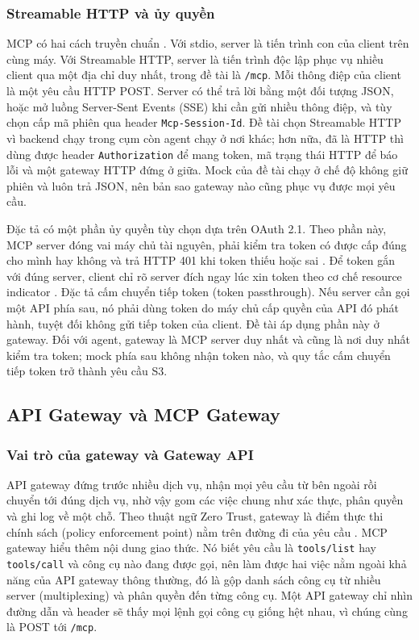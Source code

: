 \subsubsection{Streamable HTTP và ủy quyền}

MCP có hai cách truyền chuẩn \parencite{mcp_transports}. Với stdio, server là tiến trình con của client trên cùng máy. Với Streamable HTTP, server là tiến trình độc lập phục vụ nhiều client qua một địa chỉ duy nhất, trong đề tài là \texttt{/mcp}. Mỗi thông điệp của client là một yêu cầu HTTP POST. Server có thể trả lời bằng một đối tượng JSON, hoặc mở luồng Server-Sent Events (SSE) khi cần gửi nhiều thông điệp, và tùy chọn cấp mã phiên qua header \texttt{Mcp-Session-Id}. Đề tài chọn Streamable HTTP vì backend chạy trong cụm còn agent chạy ở nơi khác; hơn nữa, đã là HTTP thì dùng được header \texttt{Authorization} để mang token, mã trạng thái HTTP để báo lỗi và một gateway HTTP đứng ở giữa. Mock của đề tài chạy ở chế độ không giữ phiên và luôn trả JSON, nên bản sao gateway nào cũng phục vụ được mọi yêu cầu.

Đặc tả có một phần ủy quyền tùy chọn dựa trên OAuth 2.1. Theo phần này, MCP server đóng vai máy chủ tài nguyên, phải kiểm tra token có được cấp đúng cho mình hay không và trả HTTP 401 khi token thiếu hoặc sai \parencite{mcp_authorization}. Để token gắn với đúng server, client chỉ rõ server đích ngay lúc xin token theo cơ chế resource indicator \parencite{rfc8707}. Đặc tả cấm chuyển tiếp token (token passthrough). Nếu server cần gọi một API phía sau, nó phải dùng token do máy chủ cấp quyền của API đó phát hành, tuyệt đối không gửi tiếp token của client. Đề tài áp dụng phần này ở gateway. Đối với agent, gateway là MCP server duy nhất và cũng là nơi duy nhất kiểm tra token; mock phía sau không nhận token nào, và quy tắc cấm chuyển tiếp token trở thành yêu cầu S3.

\subsection{API Gateway và MCP Gateway}

\subsubsection{Vai trò của gateway và Gateway API}

API gateway đứng trước nhiều dịch vụ, nhận mọi yêu cầu từ bên ngoài rồi chuyển tới đúng dịch vụ, nhờ vậy gom các việc chung như xác thực, phân quyền và ghi log về một chỗ. Theo thuật ngữ Zero Trust, gateway là điểm thực thi chính sách (policy enforcement point) nằm trên đường đi của yêu cầu \parencite{nist80207}. MCP gateway hiểu thêm nội dung giao thức. Nó biết yêu cầu là \texttt{tools/list} hay \texttt{tools/call} và công cụ nào đang được gọi, nên làm được hai việc nằm ngoài khả năng của API gateway thông thường, đó là gộp danh sách công cụ từ nhiều server (multiplexing) và phân quyền đến từng công cụ. Một API gateway chỉ nhìn đường dẫn và header sẽ thấy mọi lệnh gọi công cụ giống hệt nhau, vì chúng cùng là POST tới \texttt{/mcp}.

